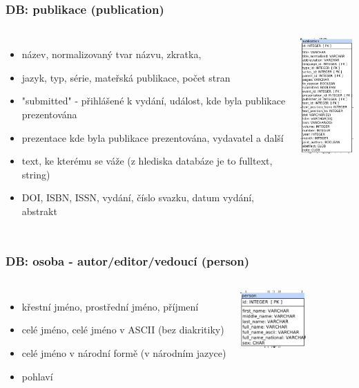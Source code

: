 \documentclass{beamer}
\begin{document}
\begin{frame}
  \frametitle{DB: publikace (publication)}
  \begin{columns}
      \fontsize{10pt}{11pt}\selectfont
      \begin{itemize}
        \item název, normalizovaný tvar názvu, zkratka, 
        \item jazyk, typ, série, mateřská publikace, počet stran
        \item "submitted" - přihlášené k vydání, událost, kde byla publikace prezentována
        \item prezentace kde byla publikace prezentována, vydavatel a další
        \item text, ke kterému se váže (z hlediska databáze je to fulltext, string)
        \item DOI, ISBN, ISSN, vydání, číslo svazku, datum vydání, abstrakt
      \end{itemize}
      \includegraphics[width=2.5cm]{rrs_db_publ.jpeg}
  \end{columns}
\end{frame}

\begin{frame}
  \frametitle{DB: osoba - autor/editor/vedoucí (person)}
  \begin{columns}
      \begin{itemize}
        \item křestní jméno, prostřední jméno, příjmení
        \item celé jméno, celé jméno v ASCII (bez diakritiky)
        \item celé jméno v národní formě (v národním jazyce)
        \item pohlaví
      \end{itemize}
      \includegraphics[width=2.5cm]{rrs_db_pers.jpeg}
  \end{columns}
\end{frame}
\end{document}
